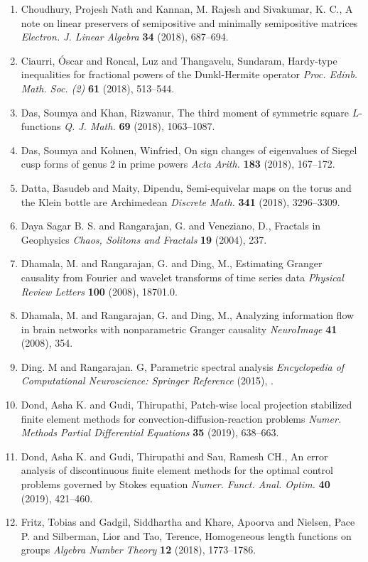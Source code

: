 \begin{enumerate}
\item Choudhury, Projesh Nath and Kannan, M. Rajesh and Sivakumar,
K. C., A note on linear preservers of semipositive and minimally
semipositive matrices {\em Electron. J. Linear Algebra} {\bf 34} (2018), 687--694.
\item Ciaurri, \'{O}scar and Roncal, Luz and Thangavelu, Sundaram, Hardy-type inequalities for fractional powers of the
{D}unkl-{H}ermite operator {\em Proc. Edinb. Math. Soc. (2)} {\bf 61} (2018), 513--544.
\item Das, Soumya and Khan, Rizwanur, The third moment of symmetric square {$L$}-functions {\em Q. J. Math.} {\bf 69} (2018), 1063--1087.
\item Das, Soumya and Kohnen, Winfried, On sign changes of eigenvalues of {S}iegel cusp forms of genus
2 in prime powers {\em Acta Arith.} {\bf 183} (2018), 167--172.
\item Datta, Basudeb and Maity, Dipendu, Semi-equivelar maps on the torus and the {K}lein bottle are
{A}rchimedean {\em Discrete Math.} {\bf 341} (2018), 3296--3309.
\item Daya Sagar B. S. and Rangarajan, G. and Veneziano, D., Fractals in Geophysics {\em Chaos, Solitons and Fractals} {\bf 19} (2004), 237.
\item Dhamala, M. and Rangarajan, G. and Ding, M., Estimating Granger causality from Fourier and wavelet transforms of time series data {\em Physical Review Letters} {\bf 100} (2008), 18701.0.
\item Dhamala, M. and Rangarajan, G. and Ding, M., Analyzing information flow in brain networks with nonparametric Granger causality {\em NeuroImage} {\bf 41} (2008), 354.
\item Ding. M and Rangarajan. G, Parametric spectral analysis {\em Encyclopedia of Computational Neuroscience: Springer Reference} {\bf } (2015), .
\item Dond, Asha K. and Gudi, Thirupathi, Patch-wise local projection stabilized finite element methods
for convection-diffusion-reaction problems {\em Numer. Methods Partial Differential Equations} {\bf 35} (2019), 638--663.
\item Dond, Asha K. and Gudi, Thirupathi and Sau, Ramesh CH., An error analysis of discontinuous finite element methods for
the optimal control problems governed by {S}tokes equation {\em Numer. Funct. Anal. Optim.} {\bf 40} (2019), 421--460.
\item Fritz, Tobias and Gadgil, Siddhartha and Khare, Apoorva and Nielsen, Pace P. and Silberman, Lior and Tao, Terence, Homogeneous length functions on groups {\em Algebra Number Theory} {\bf 12} (2018), 1773--1786.

\end{enumerate}
